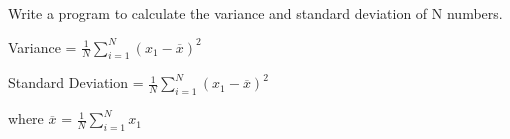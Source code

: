 \documentclass[a4paper,12pt]{article}
\begin{document}
Write a program to calculate the variance and standard deviation of N numbers.

Variance = $\frac{1}{N}\sum_{i=1}^N(x_{1}-\overline{x})^2$

Standard Deviation = $\frac{1}{N}\sum_{i=1}^N(x_{1}-\overline{x})^2$

where $\overline{x}$ = $\frac{1}{N}\sum_{i=1}^Nx_{1}$
\end{document}
